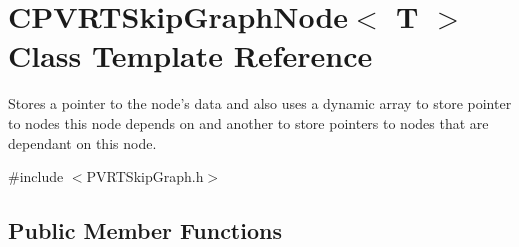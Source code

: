 \hypertarget{class_c_p_v_r_t_skip_graph_node}{\section{C\+P\+V\+R\+T\+Skip\+Graph\+Node$<$ T $>$ Class Template Reference}
\label{class_c_p_v_r_t_skip_graph_node}
}


Stores a pointer to the node's data and also uses a dynamic array to store pointer to nodes this node depends on and another to store pointers to nodes that are dependant on this node.  




{\ttfamily \#include $<$P\+V\+R\+T\+Skip\+Graph.\+h$>$}

\subsection*{Public Member Functions}
